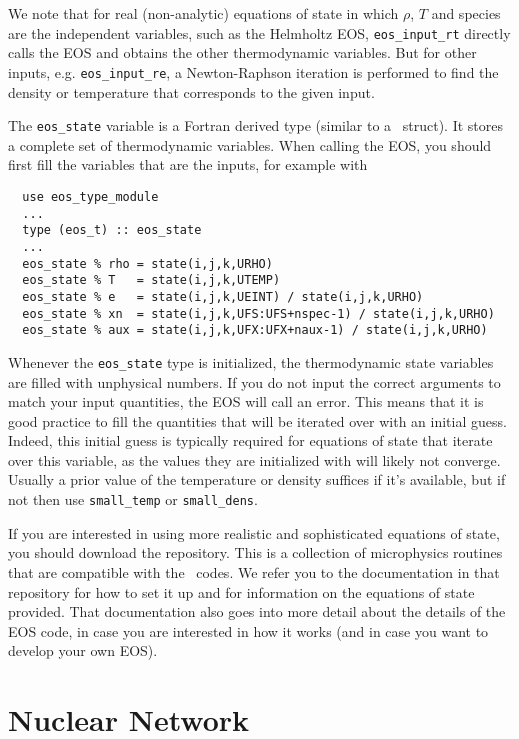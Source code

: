 We note that for real (non-analytic) equations of state
in which $\rho$, $T$ and species are the independent variables, such
as the Helmholtz EOS, {\tt eos\_input\_rt} directly calls the EOS
and obtains the other thermodynamic variables. But for other inputs,
e.g. {\tt eos\_input\_re}, a Newton-Raphson iteration is performed
to find the density or temperature that corresponds to the given
input.

The {\tt eos\_state} variable is a Fortran derived type (similar to
a \cpp\ struct). It stores a complete set of thermodynamic
variables. When calling the EOS, you should first fill the variables
that are the inputs, for example with
\begin{verbatim}
  use eos_type_module
  ...
  type (eos_t) :: eos_state
  ...
  eos_state % rho = state(i,j,k,URHO)
  eos_state % T   = state(i,j,k,UTEMP)
  eos_state % e   = state(i,j,k,UEINT) / state(i,j,k,URHO)
  eos_state % xn  = state(i,j,k,UFS:UFS+nspec-1) / state(i,j,k,URHO)
  eos_state % aux = state(i,j,k,UFX:UFX+naux-1) / state(i,j,k,URHO)
\end{verbatim}
Whenever the \texttt{eos\_state} type is initialized, the
thermodynamic state variables are filled with unphysical numbers. If
you do not input the correct arguments to match your input quantities,
the EOS will call an error. This means that it is good
practice to fill the quantities that will be iterated over with an
initial guess. Indeed, this initial guess is typically required for
equations of state that iterate over this variable, as the values
they are initialized with will likely not
converge. Usually a prior value of the temperature or density suffices
if it's available, but if not then use \texttt{small\_temp} or
\texttt{small\_dens}.

If you are interested in using more realistic and sophisticated equations of
state, you should download the \href{https://github.com/starkiller-astro/Microphysics}{\microphysics}
repository. This is a collection of microphysics routines that are compatible with the
\boxlib\ codes. We refer you to the documentation in that repository for how to set it up
and for information on the equations of state provided. That documentation
also goes into more detail about the details of the EOS code, in case you are interested in
how it works (and in case you want to develop your own EOS).

\section{Nuclear Network}

